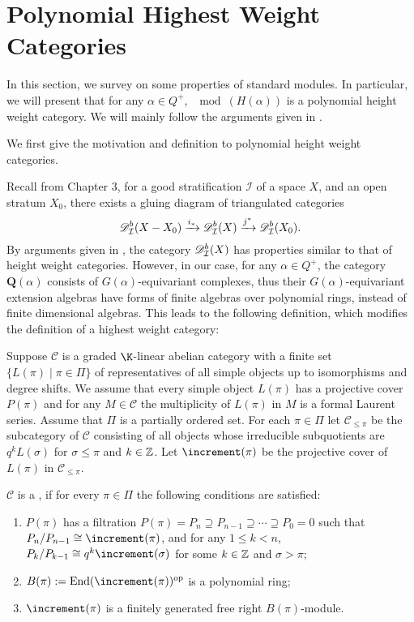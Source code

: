 \section{Polynomial Highest Weight Categories}

In this section, we survey on some properties of standard modules.
In particular, we will present that for any $\alpha\in Q^+$,
$\mod(H(\alpha))$ is a polynomial height weight category.
We will mainly follow the arguments given in \cite{BKM}.

We first give the motivation and definition to polynomial height weight categories.

Recall from Chapter 3, for a good stratification
$\mathcal{I}$ of a space $X$, and an open stratum $X_0$,
there exists a gluing diagram of triangulated categories
\[
    \mathscr{D}^b_{\mathcal{I}}(X-X_0)\xrightarrow{i_*}\mathscr{D}^b_{\mathcal{I}}(X)\xrightarrow{j^*}\mathscr{D}^b_{\mathcal{I}}(X_0).
\]
By arguments given in \cite{CPS}, the category $\mathscr{D}^b_{\mathcal{I}}(X)$
has properties similar to that of height weight categories.
However, in our case, for any $\alpha\in Q^+$, the category $\mathbf{Q}(\alpha)$
consists of $G(\alpha)$-equivariant complexes, thus their $G(\alpha)$-equivariant
extension algebras have forms of finite algebras over polynomial rings,
instead of finite dimensional algebras. This leads to the following definition,
which modifies the definition of a highest weight category:

\begin{definition}
    Suppose $\mathcal{C}$ is a graded $\K$-linear abelian category
    with a finite set $\{L(\pi)\mid\pi\in\Pi\}$ of representatives
    of all simple objects up to isomorphisms and degree shifts.
    We assume that every simple object $L(\pi)$ has a projective cover
    $P(\pi)$ and for any $M\in\mathcal{C}$ the multiplicity of $L(\pi)$
    in $M$ is a formal Laurent series. Assume that $\Pi$ is a partially
    ordered set. For each $\pi\in\Pi$ let $\mathcal{C}_{\le\pi}$
    be the subcategory of $\mathcal{C}$ consisting of all objects
    whose irreducible subquotients are $q^kL(\sigma)$ for $\sigma\le\pi$
    and $k\in\mathbb{Z}$. Let $\std(\pi)$ be the projective cover of
    $L(\pi)$ in $\mathcal{C}_{\le\pi}$.

    $\mathcal{C}$ is a ,
    if for every $\pi\in\Pi$ the following conditions are satisfied:
    \begin{enumerate}[1)]
        \item $P(\pi)$ has a filtration $P(\pi) = P_n\supseteq
        P_{n-1}\supseteq\cdots\supseteq P_0 = 0$ such that 
        $P_n/P_{n-1}\cong\std(\pi)$, and for any $1\le k<n$,
        $P_k/P_{k-1}\cong q^k\std(\sigma)$ for some $k\in\mathbb{Z}$ and $\sigma>\pi$;
        \item $B(\pi) := \End(\std(\pi))^{\mathrm{op}}$ is a polynomial ring;
        \item $\std(\pi)$ is a finitely generated free right $B(\pi)$-module.
    \end{enumerate}
\end{definition}


